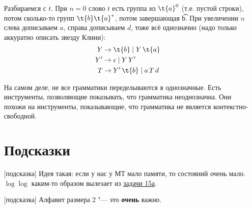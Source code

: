 	Разбираемся с $t$.
	При $n=0$ слово $t$ есть группа из $\t{a}^0$ (т.е. пустой строки), потом сколько-то групп $\t{b}\t{a}^*$, потом завершающая \t{b}.
	При увеличении $n$ слева дописываем $a$, справа дописываем $d$, тоже всё однозначно (надо только аккуратно описать
	звезду Клини):
	\begin{align*}
		Y &\to \t{b} \mid Y\,\t{a} \\
		Y' &\to \epsilon \mid Y\,Y' \\
		T &\to Y'\,\t{b} \mid a\,T\,d
	\end{align*}

	\begin{Rem}
		На самом деле, не все грамматики переделываются в однозначные.
		Есть инструменты, позволяющие показывать, что грамматика неоднозначна.
		Они похожи на инструменты, показывающие, что грамматика не является контекстно-свободной.
	\end{Rem}

\section{Подсказки}
[подсказка]
	Идея такая: если у нас у МТ мало памяти, то состояний очень мало.
	$\log \log$ каким-то образом вылезает из \hyperref[prob15a]{задачи 15а}.
	\TODO

[подсказка]
	Алфавит размера 2 "--- это \textbf{очень} важно.

